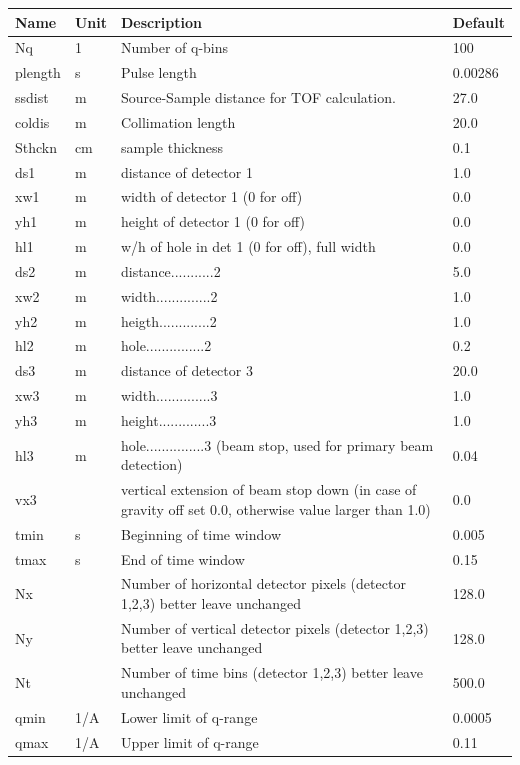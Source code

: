 \begin{longtable}{p{}p{}p{}p{}}
\toprule
\textbf{Name} & \textbf{Unit} & \textbf{Description} & \textbf{Default} \\
\midrule
\endhead
Nq & 1 & Number of q-bins & 100 \\
plength & s & Pulse length & 0.00286 \\
ssdist & m & Source-Sample distance for TOF calculation. & 27.0 \\
coldis & m & Collimation length & 20.0 \\
Sthckn & cm & sample thickness & 0.1 \\
ds1 & m & distance of detector 1 & 1.0 \\
xw1 & m & width  of detector 1 (0 for off) & 0.0 \\
yh1 & m & height of detector 1 (0 for off) & 0.0 \\
hl1 & m & w/h of hole in det 1 (0 for off), full width & 0.0 \\
ds2 & m & distance...........2 & 5.0 \\
xw2 & m & width..............2 & 1.0 \\
yh2 & m & heigth.............2 & 1.0 \\
hl2 & m & hole...............2 & 0.2 \\
ds3 & m & distance of detector 3 & 20.0 \\
xw3 & m & width..............3 & 1.0 \\
yh3 & m & height.............3 & 1.0 \\
hl3 & m & hole...............3 (beam stop, used for primary beam detection) & 0.04 \\
vx3 &  & vertical extension of beam stop down (in case of gravity off set 0.0, otherwise value larger than 1.0) & 0.0 \\
tmin & s & Beginning of time window & 0.005 \\
tmax & s & End of time window & 0.15 \\
Nx &  & Number of horizontal detector pixels (detector 1,2,3) better leave unchanged & 128.0 \\
Ny &  & Number of vertical   detector pixels (detector 1,2,3) better leave unchanged & 128.0 \\
Nt &  & Number of time bins                  (detector 1,2,3) better leave unchanged & 500.0 \\
qmin & 1/A & Lower limit of q-range & 0.0005 \\
qmax & 1/A & Upper limit of q-range & 0.11 \\

\end{longtable}
